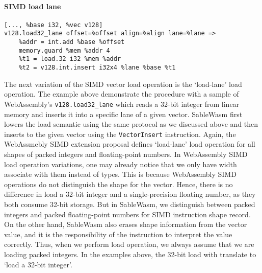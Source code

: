 \paragraph{SIMD load lane} \quad
\begin{lstlisting}[basicstyle=\linespread{1}\small\ttfamily, language=SableWasmMIR]
[..., %base i32, %vec v128]
v128.load32_lane offset=%offset align=%align lane=%lane =>
    %addr = int.add %base %offset
    memory.guard %mem %addr 4
    %t1 = load.32 i32 %mem %addr
    %t2 = v128.int.insert i32x4 %lane %base %t1
\end{lstlisting}
The next variation of the SIMD vector load operation is the `load-lane' load operation. The example above demonstrate the procedure with a sample of WebAssembly's \texttt{v128.load32\_lane}  which reads a 32-bit integer from linear memory and inserts it into a specific lane of a given vector. SableWasm first lowers the load semantic using the same protocol as we discussed above and then inserts to the given vector using the \texttt{VectorInsert} instruction. Again, the WebAssmebly SIMD extension proposal defines `load-lane' load operation for all shapes of packed integers and floating-point numbers. In WebAssembly SIMD load operation variations, one may already notice that we only have width associate with them instead of types. This is because WebAssembly SIMD operations do not distinguish the shape for the vector. Hence, there is no difference in load a 32-bit integer and a single-precision floating number, as they both consume 32-bit storage. But in SableWasm, we distinguish between packed integers and packed floating-point numbers for SIMD instruction shape record.  On the other hand, SableWasm also erases shape information from the vector value, and it is the responsibility of the instruction to interpret the value correctly. Thus, when we perform load operation, we always assume that we are loading packed integers. In the examples above, the 32-bit load with translate to `load a 32-bit integer'.


